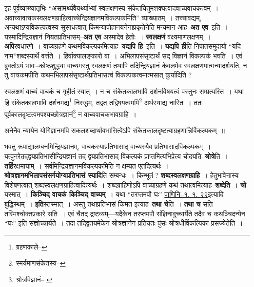 \documentclass[article,12pt,a4paper]{memoir}
\begin{document}
	  \pstart इह पूर्वव्याख्यातृभिः “असामर्थ्यवैयर्थ्याभ्यां स्वलक्षणस्य संकेतयितुमशक्यत्वादवाच्यवाचकत्वम् । अवाच्यावाचकस्वलक्षणग्राहित्वाच्चेन्द्रियज्ञानमविकल्पकमिति” व्याख्यातम् । तच्चावद्यम्, अन्यथाऽप्यविकल्पत्वस्य सुसाधत्वात् किमन्यापोहानयनेनाप्रकृतेनेति मन्यमान आह--\textbf{अत एव}--इति । यस्मादिन्द्रियज्ञानं नियतप्रतिभासम्--\textbf{अत एव} अस्मादेव हेतोः । \textbf{स्वलक्षणं} वक्ष्यमाणलक्षणम् । \textbf{अपि}रवधारणे । वाच्यग्रहणे कथमविकल्पकमित्याह--\textbf{यद्यपि हि}--इति । \textbf{यद्यपि ही}ति निपातसमुदायो “यदि नाम”शब्दस्यार्थे वर्त्तते । हिर्वाक्यालङ्कारो वा । अभिलापसंसृष्टार्थं सद् विज्ञानं विकल्पकं भवति । एवं ब्रुवतोऽयं भावः--कोष्ठशुद्ध्या वाच्यमस्तु स्वलक्षणं तथापि तदिन्द्रियज्ञानं केवलमेव स्वलक्षणमात्मन्यादर्शयति, न तु वाचकमपीति कथमभिलापसंसृष्टार्थप्रतिभासत्वं विकल्पकत्वमात्मसात् कुर्यादिति ?
	\pend
	  \bigskip
	  \begingroup
	

	  \pstart स्वलक्षणं वाच्यं वाचकं च गृहीतं स्यात् । न च संकेतकालभावि दर्शनविषयत्वं वस्तुनः सम्प्रत्यस्ति । यथा हि संकेतकालभावि दर्शनमद्य\footnote{ग्रहणकाले--\cite{dp-msD-n}} निरुद्धम्, तद्वत् तद्विषयत्वमपि\footnote{स्मर्यमाणसंकेतस्य--\cite{dp-msD-n}} अर्थस्याद्य नास्ति । ततः पूर्वकालदृष्टत्वमपश्यच्छोत्रज्ञानं\footnote{श्रोत्रविज्ञानं--\cite{dp-msB} \cite{dp-msD} \cite{dp-edN}} न वाच्यवाचकभावग्राहि ।
	\pend
       

	  \pstart अनेनैव न्यायेन योगिज्ञानमपि सकलशब्दार्थावभासित्वेऽपि संकेतकालदृष्टत्वाग्रहणान्निर्विकल्पकम् ॥
	\pend
      
	  \endgroup
	

	  \pstart भवतु रूपाद्यालम्बनमिन्द्रियज्ञानम्, वाचकस्याप्रतिभासाद् वाच्यस्यैव प्रतिभासादविकल्पकम् । यत्पुनरेतद्द्वयप्रतिभासीन्द्रियज्ञानं तद् द्वयप्रतिभासाद् विकल्पकं प्राप्तमित्यभिप्रेत्य चोदयति--\textbf{श्रोत्रे}ति । \textbf{तर्हि}रक्षमायाम् । सर्वमिन्द्रियज्ञानमविकल्पकमिति न क्षम्यत एतदित्यर्थः । \textbf{श्रोत्रज्ञानमभिलापसंसर्गयोग्यप्रतिभासं स्यादि}ति सम्बन्धः । किम्भूतं ? \textbf{शब्दस्वलक्षणग्राहि} । हेतुभावेनास्य विशेषणत्वात् शब्दस्वलक्षणग्राहित्वादित्यर्थः । शब्दग्राहिणोऽपि वाच्याग्रहणे कथं तथात्वमित्याह--\textbf{शब्देति}\leavevmode{} । \textbf{चो} यस्मात् । \textbf{किञ्चिद् वाचकं किञ्चिद् वाच्यम्} । यथा “तरप्तमपौ घः” \href{http://http://sarit.indology.info/?cref=Pā.1.1.22}{पाणिनि--१. १. २२}इत्यादि बुद्धिस्थम् । \textbf{इति}स्तस्मात् । अस्तु तथाप्रतिभासं किमत इत्याह--\textbf{तथा चे}ति । \textbf{तथा च} सति तस्मिश्चोक्तप्रकारे सति । एवं चैतद् द्रष्टव्यम्—यदैकेन तरप्तमपौ संज्ञिनावुच्चार्येते तदैव च कथञ्चिदन्येन “घः” इति संज्ञोच्चार्यते । तदा तद्द्वितयमेकेन श्रोत्रज्ञानेन प्रतियतः पुंसः श्रोत्रधीर्विकल्पिका प्रसज्येतेति ।
	\pend
      
\end{document}
